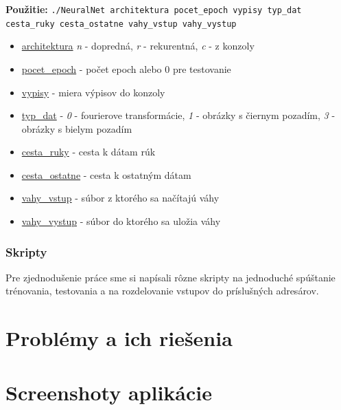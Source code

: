 \textbf{Použitie:} {\tt ./NeuralNet architektura pocet\_epoch vypisy typ\_dat cesta\_ruky cesta\_ostatne vahy\_vstup vahy\_vystup}
\begin{itemize}
\item \underline{architektura} \textit{n} - dopredná, \textit{r} - rekurentná, \textit{c} - z konzoly
\item \underline{pocet\_epoch} - počet epoch alebo 0 pre testovanie
\item \underline{vypisy} - miera výpisov do konzoly
\item \underline{typ\_dat} - \textit{0} - fourierove transformácie, \textit{1} - obrázky s čiernym pozadím, \textit{3} - obrázky s bielym pozadím
\item \underline{cesta\_ruky} - cesta k dátam rúk
\item \underline{cesta\_ostatne} - cesta k ostatným dátam
\item \underline{vahy\_vstup} - súbor z ktorého sa načítajú váhy
\item \underline{vahy\_vystup} - súbor do ktorého sa uložia váhy
\end{itemize}

\subsubsection{Skripty}
Pre zjednodušenie práce sme si napísali rôzne skripty na jednoduché spúštanie trénovania, testovania a na rozdelovanie vstupov do príslušných adresárov.
\todo

\section{Problémy a ich riešenia}
\todo

\section{Screenshoty aplikácie}
\todo